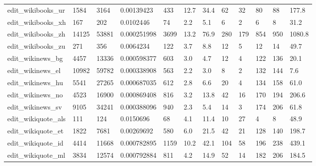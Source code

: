 \begin{longtable}{llllllllllll}
 edit\_wikibooks\_ur                                  & 1584       & 3164      & 0.00139423  & 433   & 12.7   & 34.4   & 62    & 32     & 80     & 88     & 177.8   \\
 edit\_wikibooks\_xh                                  & 167        & 202       & 0.0102446   & 74    & 2.2    & 5.1    & 6     & 2      & 6      & 8      & 31.2    \\
 edit\_wikibooks\_zh                                  & 14125      & 53881     & 0.000251998 & 3699  & 13.2   & 76.9   & 280   & 179    & 854    & 950    & 1080.8  \\
 edit\_wikibooks\_zu                                  & 271        & 356       & 0.0064234   & 122   & 3.7    & 8.8    & 12    & 5      & 12     & 14     & 49.7    \\
 edit\_wikinews\_bg                                   & 4457       & 13336     & 0.000598377 & 603   & 3.0    & 4.7    & 12    & 4      & 122    & 136    & 20.1    \\
 edit\_wikinews\_el                                   & 10982      & 59782     & 0.000338908 & 563   & 2.2    & 3.0    & 8     & 2      & 132    & 144    & 7.6     \\
 edit\_wikinews\_hu                                   & 5541       & 27265     & 0.000687035 & 612   & 2.8    & 6.6    & 20    & 4      & 134    & 158    & 61.0    \\
 edit\_wikinews\_no                                   & 4523       & 16900     & 0.000869408 & 816   & 3.2    & 13.8   & 42    & 16     & 170    & 194    & 206.6   \\
 edit\_wikinews\_sv                                   & 9105       & 34241     & 0.000388096 & 940   & 2.3    & 5.4    & 14    & 3      & 174    & 206    & 61.8    \\
 edit\_wikiquote\_als                                 & 111        & 124       & 0.0150696   & 68    & 4.1    & 11.4   & 10    & 27     & 4      & 8      & 48.9    \\
 edit\_wikiquote\_et                                  & 1822       & 7681      & 0.00269692  & 580   & 6.0    & 21.5   & 42    & 21     & 128    & 140    & 198.7   \\
 edit\_wikiquote\_id                                  & 4414       & 11668     & 0.000782895 & 1159  & 10.2   & 42.1   & 104   & 58     & 196    & 238    & 439.1   \\
 edit\_wikiquote\_ml                                  & 3834       & 12574     & 0.000792884 & 811   & 4.2    & 14.9   & 52    & 14     & 182    & 206    & 184.5   \\

\end{longtable}
